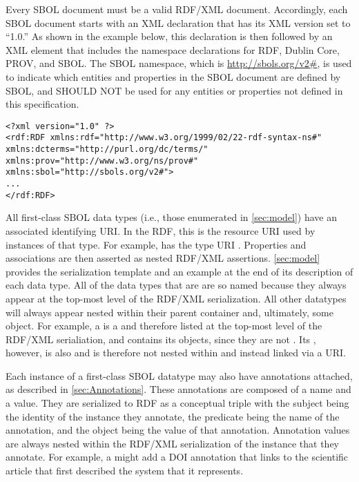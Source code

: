 Every SBOL document must be a valid RDF/XML document. Accordingly, each SBOL document starts with an XML declaration that has its XML version set to ``1.0.'' As shown in the example below, this declaration is then followed by an  XML element that includes the namespace declarations for RDF, Dublin Core, PROV, and SBOL. The SBOL namespace, which is \url{http://sbols.org/v2#}, is used to indicate which entities and properties in the SBOL document are defined by SBOL, and SHOULD NOT be used for any entities or properties not defined in this specification.
\label{xml-namespace}

\begin{lstlisting}
<?xml version="1.0" ?>
<rdf:RDF xmlns:rdf="http://www.w3.org/1999/02/22-rdf-syntax-ns#" xmlns:dcterms="http://purl.org/dc/terms/" xmlns:prov="http://www.w3.org/ns/prov#" xmlns:sbol="http://sbols.org/v2#">
...
</rdf:RDF>
\end{lstlisting}

All first-class SBOL data types (i.e., those enumerated in \ref{sec:model}) have an associated identifying URI. In the RDF, this is the resource URI used by instances of that type. For example,  has the
type URI .
Properties and associations are then asserted as nested RDF/XML assertions. 
\ref{sec:model} provides the serialization template and an example at the end of its description of each data type.
All of the data types that are  are so named because they always appear at the top-most level of the RDF/XML serialization. All other datatypes will always appear nested within their parent container and, ultimately, some  object.
For example, a  is a  and therefore listed at the top-most level of the RDF/XML serialiation, and contains its   objects, since they are not .  Its , however, is also  and is therefore not nested within and instead linked via a URI.

Each instance of a first-class SBOL datatype may also have annotations attached, as described in \ref{sec:Annotations}. These annotations are composed of a name and a value.  They are serialized to RDF as a conceptual triple with the subject being the identity of the instance they annotate, the predicate being the name of the annotation, and the object being the value of that annotation. Annotation values are always nested within the RDF/XML serialization of the instance that they annotate.
For example, a  might add a DOI annotation that links to the scientific article that first described the system that it represents.

